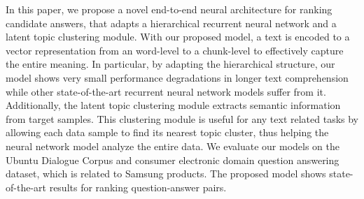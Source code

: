 In this paper, we propose a novel end-to-end neural architecture for ranking candidate answers, that adapts a hierarchical recurrent neural network and a latent topic clustering module. With our proposed model, a text is encoded to a vector representation from an word-level to a chunk-level to effectively capture the entire meaning. In particular, by adapting the hierarchical structure, our model shows very small performance degradations in longer text comprehension while other state-of-the-art recurrent neural network models suffer from it. Additionally, the latent topic clustering module extracts semantic information from target samples. This clustering module is useful for any text related tasks by allowing each data sample to find its nearest topic cluster, thus helping the neural network model analyze the entire data. We evaluate our models on the Ubuntu Dialogue Corpus and consumer electronic domain question answering dataset, which is related to Samsung products. The proposed model shows state-of-the-art results for ranking question-answer pairs.
